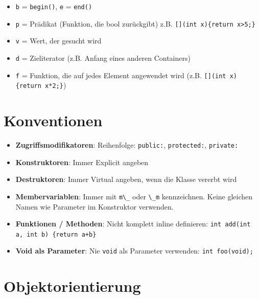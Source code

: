 \documentclass[9pt, landscape]{article}
\newcommand{\datastruct}[1]{\textbf{\textcolor{red!60!black}{#1}}}
\begin{document}
\begin{multicols*}{4}
\begin{tabularx}{\linewidth}{l >{\RaggedRight}X}
 \bottomrule
 \end{tabularx}

 \begin{itemize}
     \item \lstinline|b| = \lstinline|begin()|, \lstinline|e| = \lstinline|end()|
     \item \lstinline|p| = Prädikat (Funktion, die bool zurückgibt) z.B. \lstinline|[](int x){return x>5;}|
     \item \lstinline|v| = Wert, der gesucht wird
     \item \lstinline|d| = Zieliterator (z.B. Anfang eines anderen Containers)
     \item \lstinline|f| = Funktion, die auf jedes Element angewendet wird (z.B. \lstinline|[](int x){return x*2;}|)
 \end{itemize}

\section{Konventionen}

\begin{itemize}
\item \datastruct{Zugriffsmodifikatoren}: Reihenfolge: \lstinline|public:|, \lstinline|protected:|, \lstinline|private:|
\item \datastruct{Konstruktoren}: Immer Explicit angeben 
\item \datastruct{Destruktoren}: Immer Virtual angeben, wenn die Klasse vererbt wird
\item \datastruct{Membervariablen}: Immer mit \lstinline|m\_| oder \lstinline|\_m| kennzeichnen. Keine gleichen Namen wie Parameter im Konstruktor verwenden.
\item \datastruct{Funktionen / Methoden}: Nicht komplett inline definieren: \lstinline|int add(int a, int b) {return a+b}|
\item \datastruct{Void als Parameter}: Nie \lstinline|void| als Parameter verwenden: \lstinline|int foo(void);|
\end{itemize}

\section{Objektorientierung}


\end{multicols*}
\end{document}
